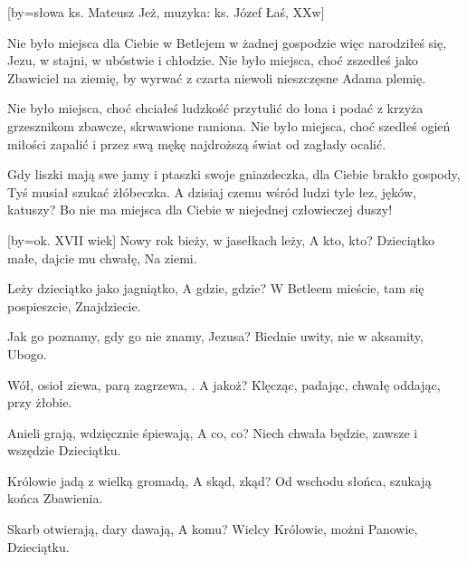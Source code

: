 [by={słowa ks. Mateusz Jeż, muzyka: ks. Józef Łaś, XXw}]

\beginverse
Nie było miejsca dla Ciebie
w Betlejem w żadnej gospodzie
więc narodziłeś się, Jezu,
w stajni, w ubóstwie i chłodzie.
\endverse
\beginchorus
Nie było miejsca, choć zszedłeś
jako Zbawiciel na ziemię,
by wyrwać z czarta niewoli
nieszczęsne Adama plemię.
\endchorus

\beginverse
Nie było miejsca, choć chciałeś
ludzkość przytulić do łona
i podać z krzyża grzesznikom
zbawcze, skrwawione ramiona.
\endverse
\beginchorus
Nie było miejsca, choć szedłeś
ogień miłości zapalić
i przez swą mękę najdroższą
świat od zagłady ocalić.
\endchorus

\beginverse
Gdy liszki mają swe jamy
i ptaszki swoje gniazdeczka,
dla Ciebie brakło gospody,
Tyś musiał szukać żłóbeczka.
\endverse
\beginchorus
A dzisiaj czemu wśród ludzi
tyle łez, jęków, katuszy?
Bo nie ma miejsca dla Ciebie
w niejednej człowieczej duszy!
\endchorus
\endsong


[by=ok. XVII wiek]
\beginverse
Nowy rok bieży, w jasełkach leży,
A kto, kto?
\endverse
\beginchorus
Dzieciątko małe, dajcie mu chwałę,
Na ziemi.
\endchorus

\beginverse
Leży dzieciątko jako jagniątko,
A gdzie, gdzie?
\endverse
\beginchorus
W Betleem mieście, tam się pospieszcie,
Znajdziecie.
\endchorus

\beginverse
Jak go poznamy, gdy go nie znamy,
Jezusa?
\endverse
\beginchorus
Biednie uwity, nie w aksamity,
Ubogo.
\endchorus

\beginverse
Wół, osioł ziewa, parą zagrzewa, .
A jakoż?
\endverse
\beginchorus
Klęcząc, padając, chwałę oddając,
przy żłobie.
\endchorus

\beginverse
Anieli grają, wdzięcznie śpiewają,
A co, co?
\endverse
\beginchorus
Niech chwała będzie, zawsze i wszędzie
Dzieciątku.
\endchorus

\beginverse
Królowie jadą z wielką gromadą,
A skąd, zkąd?
\endverse
\beginchorus
Od wschodu słońca, szukają końca
Zbawienia.
\endchorus

\beginverse
Skarb otwierają, dary dawają,
A komu?
\endverse
\beginchorus
Wielcy Królowie, możni Panowie,
Dzieciątku.
\endchorus
\endsong

